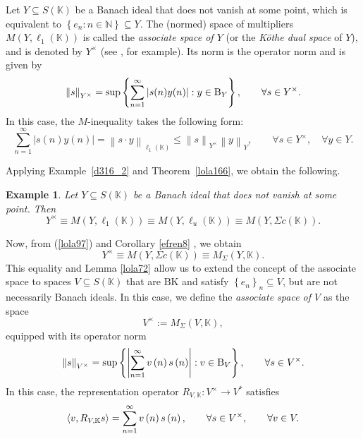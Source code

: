 \documentclass[14pt, a4paper]{article}  %
\providecommand{\llave}[1]{\left\lbrace #1\right\rbrace }
\providecommand{\pare}[1]{\left( #1\right) }
\providecommand{\norm}[1]{\left\lVert#1\right\rVert}
\providecommand{\abs}[1]{\left\lvert#1\right\rvert}
\providecommand{\Sum}[1]{\displaystyle\sum#1}
\newcommand{\tien}{\rightarrow}
\newcommand{\K}{\mathbb{K}}
\newcommand{\N}{\mathbb{N}}
\newcommand{\BK}{\text{BK}}
\newcommand{\B}{\textup{B}}
\newcommand{\la}{\left\langle}
\newcommand{\ra}{\right\rangle}
\newtheorem{example}{Example}[section]  %
\begin{document}
Let $Y \subseteq S(\K)$ be a Banach ideal that does not vanish at some point, which is equivalent to  $\llave{e_n:n\in \N} \subseteq Y$.  
The (normed) space of multipliers $M(Y, \ell_{1}(\K))$ is called the \emph{associate  space of $Y$} (or the \emph{Köthe dual space} of $Y$), and is denoted by $Y^{\times}$ (see \cite[§12]{B}, for example).  
Its norm is the operator norm and is given by
\begin{equation}
	\norm{s}_{Y^{\times}} = \sup\llave{ \sum_{n=1}^{\infty} \abs{s(n)y(n)} : y \in \B_{Y} }, 
	\qquad \forall s \in Y^{\times}.
\end{equation}
In this case, the $M$-inequality takes the following form:
\begin{equation}
	\sum_{n=1}^{\infty} \abs{s(n)y(n)}
	= \norm{s \cdot y}_{\ell_{1}(\K)}
	\leq \norm{s}_{Y^{\times}} \norm{y}_{Y},
	\qquad \forall s \in Y^{\times}, \quad \forall y \in Y.
\end{equation}



 


Applying Example~\ref{d316_2} and Theorem~\ref{lola166}, we obtain the following.
 \begin{example}\label{lola66}\label{d282_3} 
	Let $Y \subseteq S(\K)$ be a Banach ideal that does not vanish at some point. Then
	\begin{equation}\label{lola97}
		Y^{\times} \equiv M(Y,\ell_{1}(\K)) \equiv M(Y,\ell_{u}(\K)) \equiv M(Y,\Sigma c(\K)).
	\end{equation}  
\end{example} 



Now, from (\ref{lola97}) and Corollary \ref{efren8} , we obtain
\begin{equation}\label{naty31}
	Y^{\times}\equiv M\pare{Y,\Sigma c\pare{\K}}\equiv M_{\Sigma}\pare{Y,\K}. 
\end{equation}
This equality and Lemma \ref{lola72} allow us to extend the concept of the associate space to spaces $V\subseteq S\pare{\K}$ that are $\BK$ and satisfy $\llave{e_{n}}_{n}\subseteq V$, but are not necessarily Banach ideals. In this case, we define the \emph{associate space of $V$} as the space  
\begin{equation}\label{lola158}
	V^{\times}:=M_{\Sigma}\pare{V,\K}, 
\end{equation}
equipped with its operator norm
\begin{equation}\label{naty21}
	\norm{s}_{V^{\times}}=\sup\llave{\abs{\Sum_{n=1}^{\infty}v\pare{n}s\pare{n}}:v\in \B_{V}},\qquad \forall s\in V^{\times}.
	\end{equation}
	In this case, the representation operator $R_{V,\K}:V^{\times}\tien V^{*}$ satisfies
	\begin{equation}
\la v,  R_{V,\K}s\ra=\Sum_{n=1}^{\infty}v\pare{n}s\pare{n},\qquad \forall s\in V^{\times},\qquad  \forall v\in V.
\end{equation}
\end{document}
